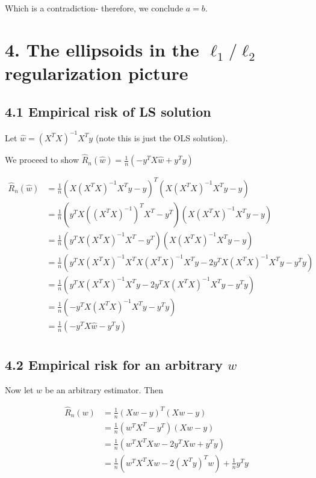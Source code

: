 \documentclass[paper=a4, fontsize=11pt]{scrartcl} %
\numberwithin{equation}{section} %
\numberwithin{figure}{section} %
\numberwithin{table}{section} %
\begin{document}
Which is a contradiction- therefore, we conclude $a = b$.



\section*{4. The ellipsoids in the $\ell_1/\ell_2$ regularization picture}

\subsection{4.1 Empirical risk of LS solution}

Let $\hat{w} = (X^TX)^{-1}X^Ty$ (note this is just the OLS solution).

We proceed to show $\hat{R}_n(\hat{w}) = \frac{1}{n}(-y^TX\hat{w} + y^Ty)$

\begin{align*}
\hat{R}_n(\hat{w}) &= \frac{1}{n} \left( X(X^TX)^{-1}X^Ty - y\right)^T\left(X(X^TX)^{-1}X^Ty - y\right) \\
	&= \frac{1}{n} \left( y^TX\left((X^TX)^{-1}\right)^TX^T - y^T\right)\left( X(X^TX)^{-1}X^Ty - y\right) \\
	&= \frac{1}{n} \left( y^TX(X^TX)^{-1}X^T - y^T\right)\left( X(X^TX)^{-1}X^Ty - y\right) \\
	&= \frac{1}{n} \left( y^TX(X^TX)^{-1}X^TX(X^TX)^{-1}X^Ty - 2y^TX(X^TX)^{-1}X^Ty - y^Ty\right) \\
	&= \frac{1}{n} \left( y^TX(X^TX)^{-1}X^Ty - 2y^TX(X^TX)^{-1}X^Ty - y^Ty\right) \\
	&= \frac{1}{n} \left( -y^TX(X^TX)^{-1}X^Ty- y^Ty\right) \\
	&= \frac{1}{n} \left( -y^TX\hat{w}- y^Ty\right) \\
\end{align*}

\subsection{4.2 Empirical risk for an arbitrary $w$}

Now let $w$ be an arbitrary estimator. Then

\begin{align*}
\hat{R}_n(w) &= \frac{1}{n}(Xw -y)^T(Xw - y) \\
	&= \frac{1}{n}(w^TX^T -y^T)(Xw - y) \\
	&= \frac{1}{n}(w^TX^TXw -2y^TXw + y^Ty) \\
	&= \frac{1}{n}(w^TX^TXw -2(X^Ty)^Tw) + \frac{1}{n}y^Ty
\end{align*}
\end{document}
